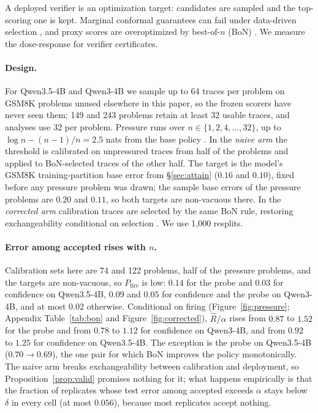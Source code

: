 \documentclass[twoside]{article}
\theoremstyle{remark}
\newcommand{\pfire}{P_{\mathrm{fire}}}
\begin{document}
A deployed verifier is an optimization target: candidates are sampled and the top-scoring one is kept. Marginal conformal guarantees can fail under data-driven selection \citep{jin2025focal}, and proxy scores are overoptimized by best-of-$n$ (BoN) \citep{gao2023scaling}. We measure the dose-response for verifier certificates.

\paragraph{Design.} For Qwen3.5-4B and Qwen3-4B we sample up to 64 traces per problem on GSM8K problems unused elsewhere in this paper, so the frozen scorers have never seen them; 149 and 243 problems retain at least 32 usable traces, and analyses use 32 per problem. Pressure runs over $n\in\{1,2,4,\dots,32\}$, up to $\log n-(n-1)/n=2.5$ nats from the base policy \citep{beirami2024bon}. In the \emph{naive arm} the threshold is calibrated on unpressured traces from half of the problems and applied to BoN-selected traces of the other half. The target is the model's GSM8K training-partition base error from \S\ref{sec:attain} ($0.16$ and $0.10$), fixed before any pressure problem was drawn; the sample base errors of the pressure problems are $0.20$ and $0.11$, so both targets are non-vacuous there. In the \emph{corrected arm} calibration traces are selected by the same BoN rule, restoring exchangeability conditional on selection \citep{jin2025focal}. We use 1{,}000 resplits.

\paragraph{Error among accepted rises with $n$.} Calibration sets here are 74 and 122 problems, half of the pressure problems, and the targets are non-vacuous, so $\pfire$ is low: $0.14$ for the probe and $0.03$ for confidence on Qwen3.5-4B, $0.09$ and $0.05$ for confidence and the probe on Qwen3-4B, and at most $0.02$ otherwise. Conditional on firing (Figure~\ref{fig:pressure}; Appendix Table~\ref{tab:bon} and Figure~\ref{fig:corrected}), $\hat R/\alpha$ rises from $0.87$ to $1.52$ for the probe and from $0.78$ to $1.12$ for confidence on Qwen3-4B, and from $0.92$ to $1.25$ for confidence on Qwen3.5-4B. The exception is the probe on Qwen3.5-4B ($0.70\to0.69$), the one pair for which BoN improves the policy monotonically. The naive arm breaks exchangeability between calibration and deployment, so Proposition~\ref{prop:valid} promises nothing for it; what happens empirically is that the fraction of replicates whose test error among accepted exceeds $\alpha$ stays below $\delta$ in every cell (at most $0.056$), because most replicates accept nothing.
\end{document}
